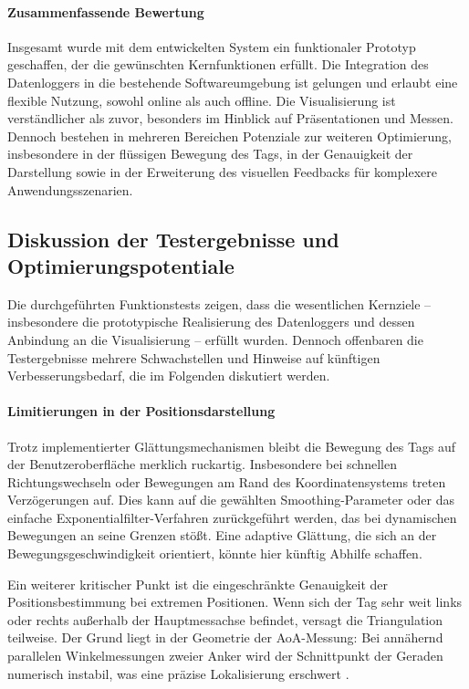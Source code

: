 \documentclass[a4paper, 12pt]{article} %
\begin{document}
\paragraph{Zusammenfassende Bewertung}
Insgesamt wurde mit dem entwickelten System ein funktionaler Prototyp geschaffen, der die gewünschten Kernfunktionen erfüllt. Die Integration des 
Datenloggers in die bestehende Softwareumgebung ist gelungen und erlaubt eine flexible Nutzung, sowohl online als auch offline. Die Visualisierung 
ist verständlicher als zuvor, besonders im Hinblick auf Präsentationen und Messen. Dennoch bestehen in mehreren Bereichen Potenziale zur weiteren 
Optimierung, insbesondere in der flüssigen Bewegung des Tags, in der Genauigkeit der Darstellung sowie in der Erweiterung des visuellen Feedbacks für
komplexere Anwendungsszenarien.

\subsection{Diskussion der Testergebnisse und Optimierungspotentiale}

Die durchgeführten Funktionstests zeigen, dass die wesentlichen Kernziele – insbesondere die prototypische Realisierung des Datenloggers und 
dessen Anbindung an die Visualisierung – erfüllt wurden. Dennoch offenbaren die Testergebnisse mehrere Schwachstellen und Hinweise auf künftigen 
Verbesserungsbedarf, die im Folgenden diskutiert werden.

\paragraph{Limitierungen in der Positionsdarstellung}

Trotz implementierter Glättungsmechanismen bleibt die Bewegung des Tags auf der Benutzeroberfläche merklich ruckartig. Insbesondere bei 
schnellen Richtungswechseln oder Bewegungen am Rand des Koordinatensystems treten Verzögerungen auf. Dies kann auf die gewählten Smoothing-Parameter 
oder das einfache Exponentialfilter-Verfahren zurückgeführt werden, das bei dynamischen Bewegungen an seine Grenzen stößt. Eine adaptive Glättung, die 
sich an der Bewegungsgeschwindigkeit orientiert, könnte hier künftig Abhilfe schaffen.

Ein weiterer kritischer Punkt ist die eingeschränkte Genauigkeit der Positionsbestimmung bei extremen Positionen. Wenn sich der Tag sehr weit 
links oder rechts außerhalb der Hauptmessachse befindet, versagt die Triangulation teilweise. Der Grund liegt in der Geometrie der \ac{AoA}-Messung: 
Bei annähernd parallelen Winkelmessungen zweier Anker wird der Schnittpunkt der Geraden numerisch instabil, was eine präzise Lokalisierung erschwert \cite{thurmond2001point}.
\end{document}
